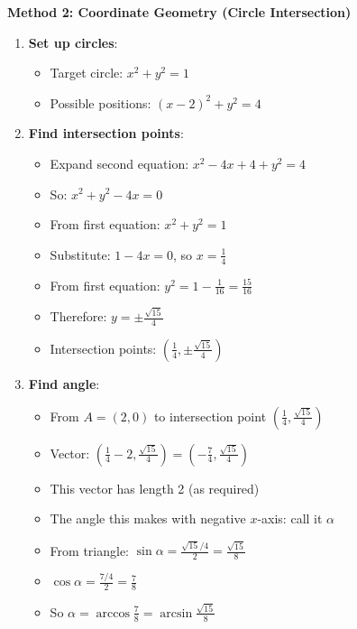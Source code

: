 \documentclass[12pt]{article}
\begin{document}
\begin{solutionbox}
\textbf{Method 2: Coordinate Geometry (Circle Intersection)}

\begin{enumerate}
    \item \textbf{Set up circles}:
    \begin{itemize}
        \item Target circle: $x^2 + y^2 = 1$
        \item Possible positions: $(x-2)^2 + y^2 = 4$
    \end{itemize}
    
    \item \textbf{Find intersection points}:
    \begin{itemize}
        \item Expand second equation: $x^2 - 4x + 4 + y^2 = 4$
        \item So: $x^2 + y^2 - 4x = 0$
        \item From first equation: $x^2 + y^2 = 1$
        \item Substitute: $1 - 4x = 0$, so $x = \frac{1}{4}$
        \item From first equation: $y^2 = 1 - \frac{1}{16} = \frac{15}{16}$
        \item Therefore: $y = \pm\frac{\sqrt{15}}{4}$
        \item Intersection points: $\left(\frac{1}{4}, \pm\frac{\sqrt{15}}{4}\right)$
    \end{itemize}
    
    \item \textbf{Find angle}:
    \begin{itemize}
        \item From $A = (2, 0)$ to intersection point $\left(\frac{1}{4}, \frac{\sqrt{15}}{4}\right)$
        \item Vector: $\left(\frac{1}{4} - 2, \frac{\sqrt{15}}{4}\right) = \left(-\frac{7}{4}, \frac{\sqrt{15}}{4}\right)$
        \item This vector has length 2 (as required)
        \item The angle this makes with negative $x$-axis: call it $\alpha$
        \item From triangle: $\sin\alpha = \frac{\sqrt{15}/4}{2} = \frac{\sqrt{15}}{8}$
        \item $\cos\alpha = \frac{7/4}{2} = \frac{7}{8}$
        \item So $\alpha = \arccos\frac{7}{8} = \arcsin\frac{\sqrt{15}}{8}$
    \end{itemize}
    

\end{enumerate}
\end{solutionbox}
\end{document}
